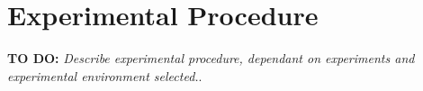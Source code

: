 \section{Experimental Procedure}
\textbf{TO DO:} \textit{Describe experimental procedure, dependant on experiments and experimental environment selected.}.




